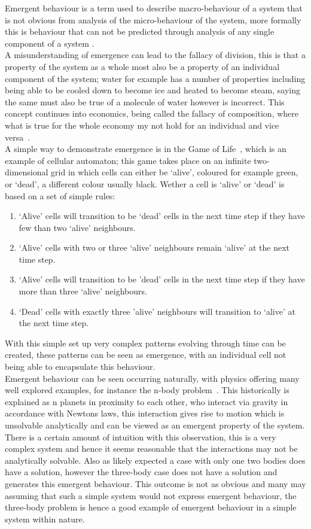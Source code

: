 \documentclass{article}
\begin{document}
Emergent behaviour is a term used to describe macro-behaviour of a system that is not obvious from analysis of the micro-behaviour of the system, more formally this is behaviour that can not be predicted through analysis of any single component of a system \cite{EB_systemofsystemsGLangford}.\\
A misunderstanding of emergence can lead to the fallacy of division, this is that a property of the system as a whole most also be a property of an individual component of the system; water for example has a number of properties including being able to be cooled down to become ice and heated to become steam, saying the same must also be true of a molecule of water however is incorrect. This concept continues into economics, being called the fallacy of composition, where what is true for the whole economy my not hold for an individual and vice versa~\cite{fallacyofcompostionBook}.\\       
A simple way to demonstrate emergence is in the Game of Life~\cite{gameoflifepage}, which is an example of cellular automaton; this game takes place on an infinite two-dimensional grid in which cells can either be `alive', coloured for example green, or `dead', a different colour usually black. Wether a cell is `alive' or `dead' is based on a set of simple rules:   
\begin{enumerate}
  \item `Alive' cells will transition to be `dead' cells in the next time step if they have few than two `alive' neighbours.
  \item `Alive' cells with two or three `alive' neighbours remain `alive' at the next time step.
  \item `Alive' cells will transition to be 'dead' cells in the next time step if they have more than three `alive' neighbours.
  \item `Dead' cells with exactly three 'alive' neighbours will transition to `alive' at the next time step.
\end{enumerate}
With this simple set up very complex patterns evolving through time can be created, these patterns can be seen as emergence, with an individual cell not being able to encapsulate this behaviour.\\
Emergent behaviour can be seen occurring naturally, with physics offering many well explored examples, for instance the n-body problem~\cite{nbodyproblem}. This historically is explained as n planets in proximity to each other, who interact via gravity in accordance with Newtons laws, this interaction gives rise to motion which is unsolvable analytically and can be viewed as an emergent property of the system. There is a certain amount of intuition with this observation, this is a very complex system and hence it seems reasonable that the interactions may not be analytically solvable. Also as likely expected a case with only one two bodies does have a solution, however the three-body case does not have a solution and generates this emergent behaviour. This outcome is not as obvious and many may assuming that such a simple system would not express emergent behaviour, the three-body problem is hence a good example of emergent behaviour in a simple system within nature.\\     
\end{document}

